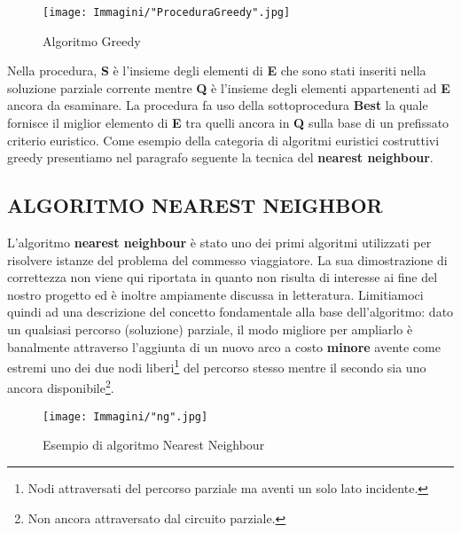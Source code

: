 \documentclass[11pt]{article}
\begin{document}
\begin{figure}[htbp]
    \centering
    \texttt{[image: Immagini/"ProceduraGreedy".jpg]}
    \caption{Algoritmo Greedy}
\end{figure}

Nella procedura, \textbf{S} è l'insieme degli elementi di \textbf{E} che sono stati inseriti nella soluzione parziale corrente mentre \textbf{Q} è l'insieme degli elementi appartenenti ad \textbf{E} ancora da esaminare.
La procedura fa uso della sottoprocedura \textbf{Best} la quale fornisce il miglior elemento di \textbf{E} tra quelli ancora in \textbf{Q} sulla base di un prefissato criterio euristico.
Come esempio della categoria di algoritmi euristici costruttivi greedy presentiamo nel paragrafo seguente la tecnica del \textbf{nearest neighbour}.

\subsection*{ALGORITMO NEAREST NEIGHBOR}
\label{sec:NearestNeighborS}

L'algoritmo \textbf{nearest neighbour} è stato uno dei primi algoritmi utilizzati per risolvere istanze del problema del commesso viaggiatore. La sua dimostrazione di correttezza non viene qui riportata in quanto non risulta di interesse ai fine del nostro progetto ed è inoltre ampiamente discussa in letteratura. Limitiamoci quindi ad una descrizione del concetto fondamentale alla base dell'algoritmo: dato un qualsiasi percorso (soluzione) parziale, il modo migliore per ampliarlo è banalmente attraverso l'aggiunta di un nuovo arco a costo \textbf{minore} avente come estremi uno dei due nodi liberi\footnote{Nodi attraversati del percorso parziale ma aventi un solo lato incidente.} del percorso stesso mentre il secondo sia uno ancora disponibile\footnote{Non ancora attraversato dal circuito parziale.}.

\begin{figure}[htbp]
    \centering
    \texttt{[image: Immagini/"ng".jpg]}
    \caption{Esempio di algoritmo Nearest Neighbour}
\end{figure}
\end{document}
